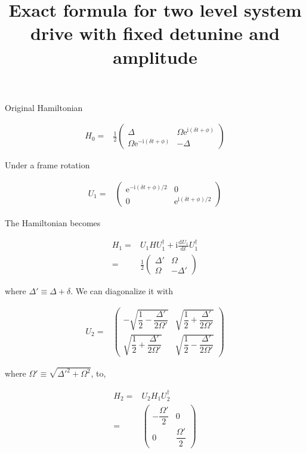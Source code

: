 \documentclass[10pt,fleqn]{article}
\title{Exact formula for two level system drive with fixed detunine and amplitude}
\newcommand{\ud}{\mathrm{d}}
\newcommand{\ue}{\mathrm{e}}
\newcommand{\ui}{\mathrm{i}}
\newcommand{\eqar}[1]
{
  \begin{align*}
    #1
  \end{align*}
}
\newcommand{\paren}[1]{{\left({#1}\right)}}
\newcommand{\diff}[3][{}]{{\frac{\ud^{#1} {#2}}{\ud {#3}{}^{#1}}}}
\begin{document}
\maketitle

Original Hamiltonian
\eqar{
  H_0=&\frac12\begin{pmatrix}
    \Delta&\Omega\ue^{\ui\paren{\delta t + \phi}}\\
    \Omega\ue^{-\ui\paren{\delta t + \phi}}&-\Delta
  \end{pmatrix}
}
Under a frame rotation
\eqar{
  U_1=&\begin{pmatrix}
    \ue^{-\ui\paren{\delta t + \phi}/2}&0\\
    0&\ue^{\ui\paren{\delta t + \phi}/2}
  \end{pmatrix}
}
The Hamiltonian becomes
\eqar{
  H_1=&U_1HU_1^\dagger+\ui\diff{U_1}{t}U_1^\dagger\\
  =&\frac12\begin{pmatrix}
    \Delta'&\Omega\\
    \Omega&-\Delta'
  \end{pmatrix}
}
where $\Delta'\equiv\Delta+\delta$. We can diagonalize it with
\eqar{
  U_2=&\begin{pmatrix}
    -\sqrt{\dfrac12-\dfrac{\Delta'}{2\Omega'}}&\sqrt{\dfrac12+\dfrac{\Delta'}{2\Omega'}}\\
    \sqrt{\dfrac12+\dfrac{\Delta'}{2\Omega'}}&\sqrt{\dfrac12-\dfrac{\Delta'}{2\Omega'}}
  \end{pmatrix}
}
where $\Omega'\equiv\sqrt{\Delta'^2+\Omega^2}$, to,
\eqar{
  H_2=&U_2H_1U_2^\dagger\\
  =&\begin{pmatrix}
    -\dfrac{\Omega'}{2}&0\\
    0&\dfrac{\Omega'}{2}
  \end{pmatrix}
}
\end{document}
